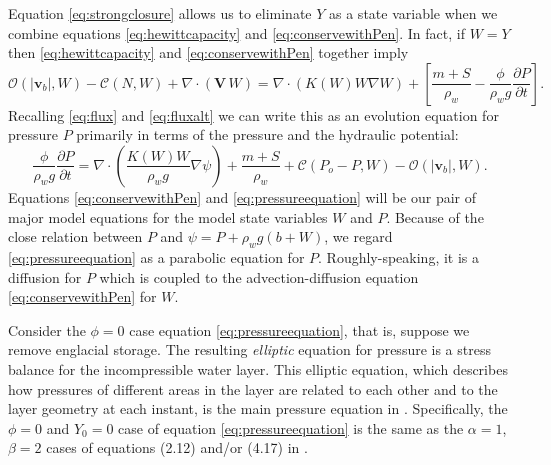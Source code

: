 \documentclass[11pt,final]{amsart}%
\newcommand\bv{\mathbf{v}}
\newcommand\bV{\mathbf{V}}
\newcommand{\Div}{\nabla\cdot}
\newcommand{\grad}{\nabla}
\begin{document}
Equation \eqref{eq:strongclosure} allows us to eliminate $Y$ as a state variable when we combine equations \eqref{eq:hewittcapacity} and \eqref{eq:conservewithPen}.  In fact, if $W=Y$ then \eqref{eq:hewittcapacity} and \eqref{eq:conservewithPen} together imply
\begin{equation}
\mathcal{O}(|\bv_b|,W) - \mathcal{C}(N,W) + \Div\left(\bV\, W\right) = \Div \left(K(W) W \grad W\right) + \left[\frac{m+S}{\rho_w} - \frac{\phi}{\rho_w g}\frac{\partial P}{\partial t}\right]. \label{eq:initialformpressure}
\end{equation}
Recalling \eqref{eq:flux} and \eqref{eq:fluxalt} we can write this as an evolution equation for pressure $P$ primarily in terms of the pressure and the hydraulic potential:
\begin{equation}
\frac{\phi}{\rho_w g}\frac{\partial P}{\partial t} = \Div\left(\frac{K(W) W}{\rho_w g} \grad \psi\right) + \frac{m+S}{\rho_w} + \mathcal{C}(P_o-P,W) - \mathcal{O}(|\bv_b|,W). \label{eq:pressureequation}
\end{equation}
Equations \eqref{eq:conservewithPen} and \eqref{eq:pressureequation} will be our pair of major model equations for the model state variables $W$ and $P$.  Because of the close relation between $P$ and $\psi = P + \rho_w g (b + W)$, we regard \eqref{eq:pressureequation} as a parabolic equation for $P$.  Roughly-speaking, it is a diffusion for $P$ which is coupled to the advection-diffusion equation \eqref{eq:conservewithPen} for $W$.

Consider the $\phi=0$ case equation \eqref{eq:pressureequation}, that is, suppose we remove englacial storage.  The resulting \emph{elliptic} equation for pressure is a stress balance for the incompressible water layer.  This elliptic equation, which describes how pressures of different areas in the layer are related to each other and to the layer geometry at each instant, is the main pressure equation in \citep{Schoofetal2012}.  Specifically, the $\phi=0$ and $Y_0=0$ case of equation \eqref{eq:pressureequation} is the same as the $\alpha=1$, $\beta=2$ cases of equations (2.12) and/or (4.17) in \citep{Schoofetal2012}.
\end{document}

